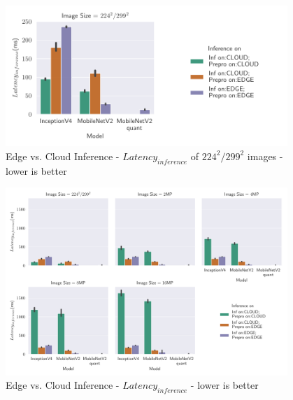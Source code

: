 \begin{figure}[!htb]
\centering
\includegraphics[width=0.95\textwidth]{./Bilder/single_plots/edge_vs_cloud_plots/Edge_vs_Cloud_Inference_Inference_Latencies_onlyNR.pdf}
\caption{Edge vs. Cloud Inference -  $Latency_{inference}$ of $224^2/299^2$ images - lower is better}
\label{fig:EdgeVsCloudInferenceLatNR}
\end{figure}
\begin{figure}[!htb]
\centering
\includegraphics[width=0.95\textwidth]{./Bilder/single_plots/edge_vs_cloud_plots/Edge_vs_Cloud_Inference_Inference_Latencies.pdf}
\caption{Edge vs. Cloud Inference -  $Latency_{inference}$ - lower is better}
\label{fig:EdgeVsCloudInferenceLat}
\end{figure}


